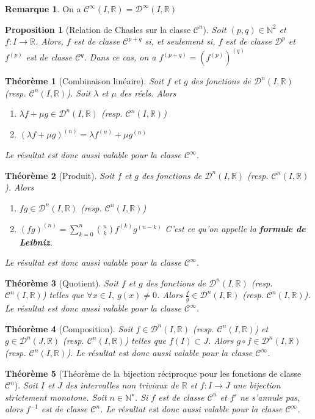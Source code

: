 \documentclass[french]{book}
\newcommand{\N}{\mathbb{N}}
\newcommand{\R}{\mathbb{R}}
\newcommand{\st}{^\star}
\newcommand{\inv}{^{-1}}
\theoremstyle{plain}
\newtheorem{thm}{Théorème}[chapter]
\newtheorem{prop}{Proposition}[chapter]
\theoremstyle{definition}
\newtheorem{rmq}{Remarque}[chapter]
\theoremstyle{remark}
\begin{document}
\begin{rmq} On a $\mathcal{C}^\infty(I, \R) =\mathcal{D}^\infty(I, \R)$ \end{rmq}
\begin{prop}[Relation de Chasles sur la classe $\mathcal{C}^n$]
	Soit $(p,q)\in\N^2$ et $f:I\rightarrow\R$. Alors, $f$ est de classe $\mathcal{C}^{p+q}$ si, et seulement si, $f$ est de classe $\mathcal{D}^p$ et $f^{(p)}$ est de classe $\mathcal{C}^q$. Dans ce cas, on a $f^{(p+q)}=(f^{(p)})^{(q)}$
\end{prop}
\begin{thm}[Combinaison linéaire]
	Soit $f$ et $g$ des fonctions de $\mathcal{D}^n(I,\R)$ (resp. $\mathcal{C}^n(I,\R)$). Soit $\lambda$ et $\mu$ des réels. Alors 
	\begin{enumerate}
		\item $\lambda f+\mu g \in\mathcal{D}^n(I,\R)$ (resp. $\mathcal{C}^n(I,\R)$)
		\item $(\lambda f +\mu g)^{(n)}=\lambda f^{(n)}+\mu g^{(n)}$
	\end{enumerate}
	Le résultat est donc aussi valable pour la classe $\mathcal{C}^\infty$.
\end{thm}
\begin{thm}[Produit]
	Soit $f$ et $g$ des fonctions de $\mathcal{D}^n(I,\R)$ (resp. $\mathcal{C}^n(I,\R)$). Alors 
	\begin{enumerate}
		\item $fg \in\mathcal{D}^n(I,\R)$ (resp. $\mathcal{C}^n(I,\R)$)
		\item $\displaystyle (fg)^{(n)}=\sum_{k=0}^{n}\binom{n}{k}f^{(k)}g^{(n-k)}$ C'est ce qu'on appelle la \textbf{formule de Leibniz}.
	\end{enumerate}
	Le résultat est donc aussi valable pour la classe $\mathcal{C}^\infty$.
\end{thm}
\begin{thm}[Quotient]
	Soit $f$ et $g$ des fonctions de $\mathcal{D}^n(I,\R)$ (resp. $\mathcal{C}^n(I,\R)$) telles que $\forall x \in I, \ g(x)\ne 0$. Alors $\displaystyle \frac{f}{g} \in\mathcal{D}^n(I,\R)$ (resp. $\mathcal{C}^n(I,\R)$).
	Le résultat est donc aussi valable pour la classe $\mathcal{C}^\infty$.
\end{thm}
\begin{thm}[Composition]
	Soit $f \in \mathcal{D}^n(I,\R)$ (resp. $\mathcal{C}^n(I,\R)$) et $g \in \mathcal{D}^n(J,\R)$ (resp. $\mathcal{C}^n(I,\R)$) telles que $f(I)\subset J $. Alors $g \circ f \in\mathcal{D}^n(I,\R)$ (resp. $\mathcal{C}^n(I,\R)$).
	Le résultat est donc aussi valable pour la classe $\mathcal{C}^\infty$.
\end{thm}
\begin{thm}[Théorème de la bijection réciproque pour les fonctions de classe $\mathcal{C}^n$]
	Soit $I$ et $J$ des intervalles non triviaux de $\R$ et $f:I\rightarrow J$ une bijection strictement monotone. Soit $n\in\N\st$. Si $f$ est de classe $\mathcal{C}^n$ et $f'$ ne s'annule pas, alors $f\inv$ est de classe $\mathcal{C}^n$. Le résultat est donc aussi valable pour la classe  $\mathcal{C}^\infty$.
\end{thm}
\end{document}
